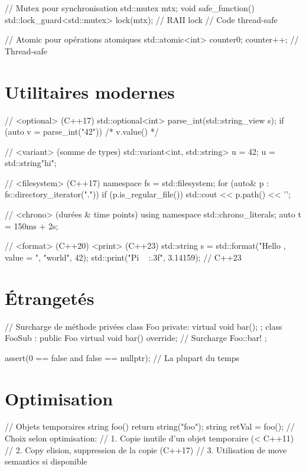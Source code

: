 \documentclass{article}
\begin{document}
\begin{multicols*}{4}
\begin{cppcode}
// Mutex pour synchronisation
std::mutex mtx;
void safe_function() {
    std::lock_guard<std::mutex> lock(mtx); // RAII lock
    // Code thread-safe
}

// Atomic pour opérations atomiques
std::atomic<int> counter{0};
counter++; // Thread-safe

\end{cppcode}

\section*{Utilitaires modernes}

\begin{cppcode}
// <optional> (C++17)
std::optional<int> parse_int(std::string_view s);
if (auto v = parse_int("42")) { /* v.value() */ }

// <variant> (somme de types)
std::variant<int, std::string> u = 42;
u = std::string{"hi"};

// <filesystem> (C++17)
namespace fs = std::filesystem;
for (auto& p : fs::directory_iterator(".")) {
    if (p.is_regular_file()) std::cout << p.path() << '\n';
}

// <chrono> (durées & time points)
using namespace std::chrono_literals;
auto t = 150ms + 2s;

// <format> (C++20) <print> (C++23)
std::string s = std::format("Hello {}, value = {}", "world", 42);
std::print("Pi ~ {:.3f}\n", 3.14159); // C++23
\end{cppcode}

\section*{Étrangetés}

\begin{cppcode}
// Surcharge de méthode privées
class Foo {
private:
   virtual void bar();
};
class FooSub : public Foo {
   virtual void bar() override;      // Surcharge Foo::bar!
};

assert(0 == false and false == nullptr); // La plupart du temps
\end{cppcode}

\section*{Optimisation}
\begin{cppcode}
// Objets temporaires
string foo() { return string("foo"); }
string retVal = foo(); // Choix selon optimisation:
// 1. Copie inutile d'un objet temporaire (< C++11)
// 2. Copy elision, suppression de la copie (C++17)
// 3. Utilisation de move semantics si disponible


\end{cppcode}
\end{multicols*}
\end{document}
